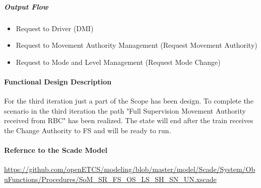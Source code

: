 \subparagraph{Output Flow}
\begin{itemize}
\item Request to Driver (DMI)
\item Request to Movement Authority Management (Request Movement Authority)
\item Request to Mode and Level Management (Request Mode Change)
\end{itemize}


\paragraph{Functional Design Description}
For the third iteration just a part of the Scope has been design. To complete the scenario in the third iteration the path "Full Supervision Movement Authority received from RBC" has been realized. The state will end after the train receives the Change Authority to FS and will be ready to run.

\paragraph{Refernce to the Scade Model}
\url{https://github.com/openETCS/modeling/blob/master/model/Scade/System/ObuFunctions/Procedures/SoM_SR_FS_OS_LS_SH_SN_UN.xscade}

